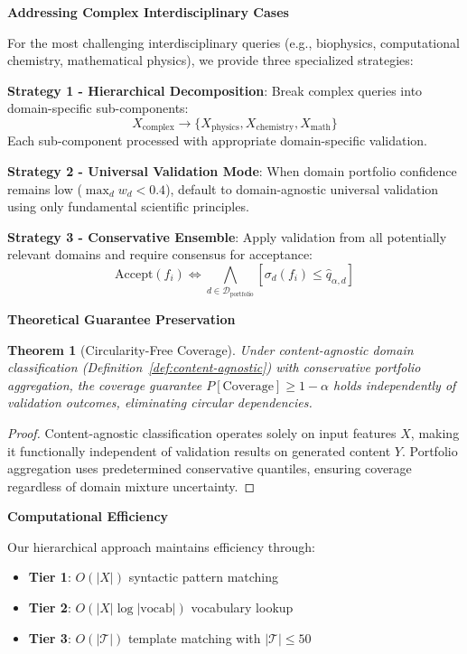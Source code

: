 \documentclass{uai2026} %
\theoremstyle{remark}
\theoremstyle{plain}
\newtheorem{theorem}{Theorem} %
\theoremstyle{definition}
\begin{document}
\textbf{Addressing Complex Interdisciplinary Cases}

For the most challenging interdisciplinary queries (e.g., biophysics, computational chemistry, mathematical physics), we provide three specialized strategies:

\textbf{Strategy 1 - Hierarchical Decomposition}: Break complex queries into domain-specific sub-components:
\begin{equation}
X_{\text{complex}} \rightarrow \{X_{\text{physics}}, X_{\text{chemistry}}, X_{\text{math}}\}
\end{equation}
Each sub-component processed with appropriate domain-specific validation.

\textbf{Strategy 2 - Universal Validation Mode}: When domain portfolio confidence remains low ($\max_d w_d < 0.4$), default to domain-agnostic universal validation using only fundamental scientific principles.

\textbf{Strategy 3 - Conservative Ensemble}: Apply validation from all potentially relevant domains and require consensus for acceptance:
\begin{equation}
\text{Accept}(f_i) \Leftrightarrow \bigwedge_{d \in \mathcal{D}_{\text{portfolio}}} [\sigma_d(f_i) \leq \hat{q}_{\alpha,d}]
\end{equation}

\textbf{Theoretical Guarantee Preservation}

\begin{theorem}[Circularity-Free Coverage]
\label{thm:circularity-free}
Under content-agnostic domain classification (Definition~\ref{def:content-agnostic}) with conservative portfolio aggregation, the coverage guarantee $P[\text{Coverage}] \geq 1-\alpha$ holds independently of validation outcomes, eliminating circular dependencies.
\end{theorem}

\begin{proof}
Content-agnostic classification operates solely on input features $X$, making it functionally independent of validation results on generated content $Y$. Portfolio aggregation uses predetermined conservative quantiles, ensuring coverage regardless of domain mixture uncertainty.
\end{proof}

\textbf{Computational Efficiency}

Our hierarchical approach maintains efficiency through:
\begin{itemize}
\item \textbf{Tier 1}: $O(|X|)$ syntactic pattern matching
\item \textbf{Tier 2}: $O(|X| \log |\text{vocab}|)$ vocabulary lookup  
\item \textbf{Tier 3}: $O(|\mathcal{T}|)$ template matching with $|\mathcal{T}| \leq 50$
\end{itemize}
\end{document}
